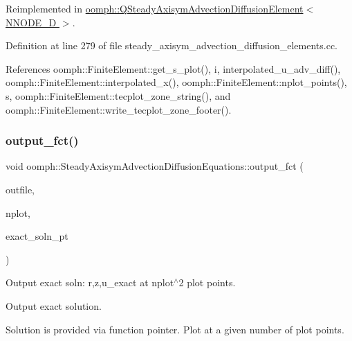 Reimplemented in \hyperlink{classoomph_1_1QSteadyAxisymAdvectionDiffusionElement_ad4d1e0792228024edcb5e8d188fbe326}{oomph\+::\+Q\+Steady\+Axisym\+Advection\+Diffusion\+Element$<$ N\+N\+O\+D\+E\+\_\+D $>$}.



Definition at line 279 of file steady\+\_\+axisym\+\_\+advection\+\_\+diffusion\+\_\+elements.\+cc.



References oomph\+::\+Finite\+Element\+::get\+\_\+s\+\_\+plot(), i, interpolated\+\_\+u\+\_\+adv\+\_\+diff(), oomph\+::\+Finite\+Element\+::interpolated\+\_\+x(), oomph\+::\+Finite\+Element\+::nplot\+\_\+points(), s, oomph\+::\+Finite\+Element\+::tecplot\+\_\+zone\+\_\+string(), and oomph\+::\+Finite\+Element\+::write\+\_\+tecplot\+\_\+zone\+\_\+footer().

\mbox{\label{classoomph_1_1SteadyAxisymAdvectionDiffusionEquations_a444263cb79d63da6bd1e7b47f9c60c72}} 
\subsubsection{\texorpdfstring{output\+\_\+fct()}{output\_fct()}}
{\footnotesize\ttfamily void oomph\+::\+Steady\+Axisym\+Advection\+Diffusion\+Equations\+::output\+\_\+fct (\begin{DoxyParamCaption}\item[{std\+::ostream \&}]{outfile,  }\item[{const unsigned \&}]{nplot,  }\item[{\hyperlink{classoomph_1_1FiniteElement_a690fd33af26cc3e84f39bba6d5a85202}{Finite\+Element\+::\+Steady\+Exact\+Solution\+Fct\+Pt}}]{exact\+\_\+soln\+\_\+pt }\end{DoxyParamCaption})\hspace{0.3cm}{\ttfamily [virtual]}}



Output exact soln\+: r,z,u\+\_\+exact at nplot$^\wedge$2 plot points. 

Output exact solution.

Solution is provided via function pointer. Plot at a given number of plot points.

